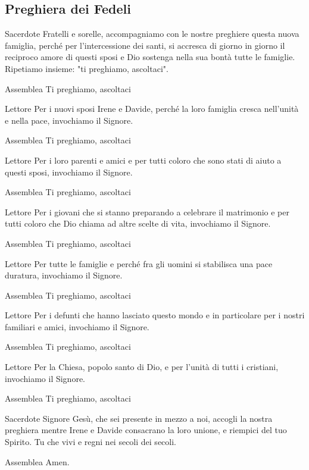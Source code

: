 
\subsection*{Preghiera dei Fedeli}

	\begin{dialoghi}
	\item[Sacerdote] Fratelli e sorelle, accompagniamo con le nostre preghiere questa nuova famiglia, perché per l'intercessione dei santi, si accresca di giorno in giorno il reciproco amore di questi sposi e Dio sostenga nella sua bontà tutte le famiglie. Ripetiamo insieme: "ti preghiamo, ascoltaci".
	\item[Assemblea] Ti preghiamo, ascoltaci
	\item[Lettore] Per i nuovi sposi Irene e Davide, perché la loro famiglia cresca nell'unità e nella pace, invochiamo il Signore.
	\item[Assemblea] Ti preghiamo, ascoltaci
	\item[Lettore] Per i loro parenti e amici e per tutti coloro che sono stati di aiuto a questi sposi, invochiamo il Signore.
	\item[Assemblea] Ti preghiamo, ascoltaci
	\item[Lettore] Per i giovani che si stanno preparando a celebrare il matrimonio e per tutti coloro che Dio chiama ad altre scelte di vita, invochiamo il Signore.
	\item[Assemblea] Ti preghiamo, ascoltaci
	\item[Lettore] Per tutte le famiglie e perché fra gli uomini si stabilisca una pace duratura, invochiamo il Signore.
	\item[Assemblea] Ti preghiamo, ascoltaci
	\item[Lettore] Per i defunti che hanno lasciato questo mondo e in particolare per i nostri familiari e amici, invochiamo il Signore.
	\item[Assemblea] Ti preghiamo, ascoltaci
	\item[Lettore] Per la Chiesa, popolo santo di Dio, e per l'unità di tutti i cristiani, invochiamo il Signore.
	\item[Assemblea] Ti preghiamo, ascoltaci
	\item[Sacerdote] Signore Gesù, che sei presente in mezzo a noi, accogli la nostra preghiera mentre Irene e Davide consacrano la loro unione, e riempici del tuo Spirito. Tu che vivi e regni nei secoli dei secoli.
	\item[Assemblea] Amen.
	\end{dialoghi}

